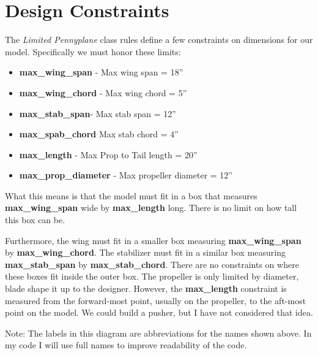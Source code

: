 \section*{Design Constraints}

The {\it Limited Pennyplane} class rules define a few constraints on dimensions
for our model. Specifically we must honor these limits:

\begin{itemize}
\item{{\bf max\_wing\_span} - Max wing span = 18''}
\item{{\bf max\_wing\_chord} - Max wing chord = 5''}
\item{{\bf max\_stab\_span}- Max stab span = 12''}
\item{{\bf max\_spab\_chord} Max stab chord = 4''}
\item{{\bf max\_length} - Max Prop to Tail length = 20''}
\item{{\bf max\_prop\_diameter} - Max propeller diameter = 12''}
\end{itemize}

What this means is that the model must fit in a box that measures {\bf
max\_wing\_span} wide by {\bf max\_length} long. There is no limit on how
tall this box can be.

Furthermore, the wing must fit in a smaller box measuring {\bf max\_wing\_span}
by {\bf max\_wing\_chord}. The stabilizer must fit in a similar box measuring
{\bf max\_stab\_span} by {\bf max\_stab\_chord}. There are no constraints on where
these boxes fit inside the outer box. The propeller is only limited by
diameter, blade shape it up to the designer. However, the {\bf max\_length}
constraint is measured from the forward-most point, usually on the propeller,
to the aft-most point on the model. We could build a pusher, but I have not
considered that idea.


Note: The labels in this diagram are abbreviations for the names shown above.
In my code I will use full names to improve readability of the code.
